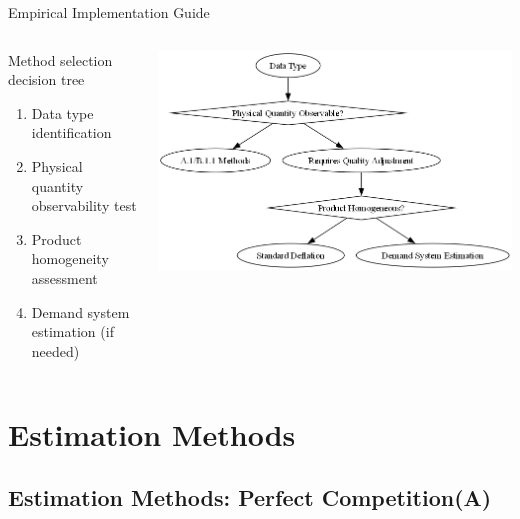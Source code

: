\documentclass[aspectratio=169]{beamer}  %
\begin{document}
\begin{frame}{Empirical Implementation Guide}
\hypertarget{mainpage}{}
\begin{columns}
    \begin{column}{0.5\textwidth}
    \begin{exampleblock}{Method selection decision tree}
    \begin{enumerate}
        \item Data type identification
        \item Physical quantity observability test
        \item Product homogeneity assessment
        \item Demand system estimation (if needed)
    \end{enumerate}
    \end{exampleblock}
    \end{column}
    \begin{column}{0.5\textwidth}
    \hyperlink{imagepage}{%
        \includegraphics[width=\textwidth]{Figure/decision_tree.png}%
    }
    \end{column}
\end{columns}
\end{frame}


\section{Estimation Methods}
\subsection{Estimation Methods: Perfect Competition(A)}
\end{document}
